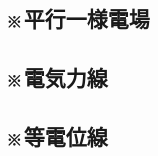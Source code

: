 \documentclass[../../../all/physics-standard_answers_all.tex]{subfiles}
\begin{document}
    \vspace{1cm}
    \vfill

\subsection{※平行一様電場}
    

    \vspace{1cm}
    \vfill

\subsection{※電気力線}
    

    \vspace{1cm}
    \vfill

\subsection{※等電位線}
    

    \vspace{1cm}
    \vfill
\end{document}
